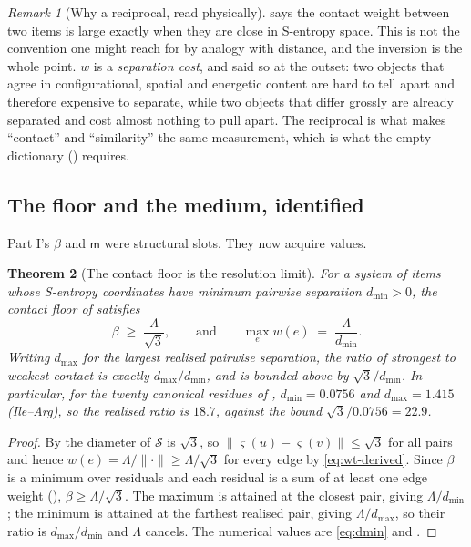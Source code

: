 \documentclass[11pt,twocolumn,a4paper]{article}
\theoremstyle{thmstyle}
\newtheorem{theorem}{Theorem}[section]
\theoremstyle{definition}
\theoremstyle{remark}
\newtheorem{remark}[theorem]{Remark}
\newcommand{\wt}{w}
\newcommand{\med}{\mathsf{m}}
\newcommand{\flo}{\beta}
\newcommand{\Sspace}{\mathcal{S}}
\newcommand{\sse}{\varsigma}
\newcommand{\norm}[1]{\lVert#1\rVert}
\begin{document}
\begin{remark}[Why a reciprocal, read physically]
\label{rem:reciprocal}
 says the contact weight between two items
is large exactly when they are close in S-entropy space. This is not
the convention one might reach for by analogy with distance, and the
inversion is the whole point. $\wt$ is a \emph{separation cost}, and
 said so at the outset: two objects that agree in
configurational, spatial and energetic content are hard to tell apart
and therefore expensive to separate, while two objects that differ
grossly are already separated and cost almost nothing to pull apart.
The reciprocal is what makes ``contact'' and ``similarity'' the same
measurement, which is what the empty dictionary
() requires.
\end{remark}

\subsection{The floor and the medium, identified}

Part I's $\flo$ and $\med$ were structural slots. They now acquire
values.

\begin{theorem}[The contact floor is the resolution limit]
\label{thm:floor-is-resolution}
For a system of items whose S-entropy coordinates have minimum
pairwise separation $d_{\min} > 0$, the contact floor of
 satisfies
\begin{equation}
  \flo \;\geq\; \frac{\Lambda}{\sqrt3},
  \qquad\text{and}\qquad
  \max_{e} \wt(e) \;=\; \frac{\Lambda}{d_{\min}}.
  \label{eq:floor-value}
\end{equation}
Writing $d_{\max}$ for the largest realised pairwise separation, the
ratio of strongest to weakest contact is exactly $d_{\max}/d_{\min}$,
and is bounded above by $\sqrt3/d_{\min}$.
In particular, for the twenty canonical residues of ,
$d_{\min} = 0.0756$ and $d_{\max} = 1.415$ (Ile--Arg), so the realised
ratio is $18.7$, against the bound $\sqrt3/0.0756 = 22.9$.
\end{theorem}

\begin{proof}
By  the diameter of $\Sspace$ is $\sqrt3$, so
$\norm{\sse(u)-\sse(v)} \leq \sqrt3$ for all pairs and hence
$\wt(e) = \Lambda/\norm{\cdot} \geq \Lambda/\sqrt3$ for every edge
by \eqref{eq:wt-derived}. Since $\flo$ is a minimum over residuals and
each residual is a sum of at least one edge weight
(), $\flo \geq \Lambda/\sqrt3$. The maximum is
attained at the closest pair, giving $\Lambda/d_{\min}$; the minimum is
attained at the farthest realised pair, giving $\Lambda/d_{\max}$, so
their ratio is $d_{\max}/d_{\min}$ and $\Lambda$ cancels. The numerical
values are \eqref{eq:dmin} and .
\end{proof}
\end{document}
